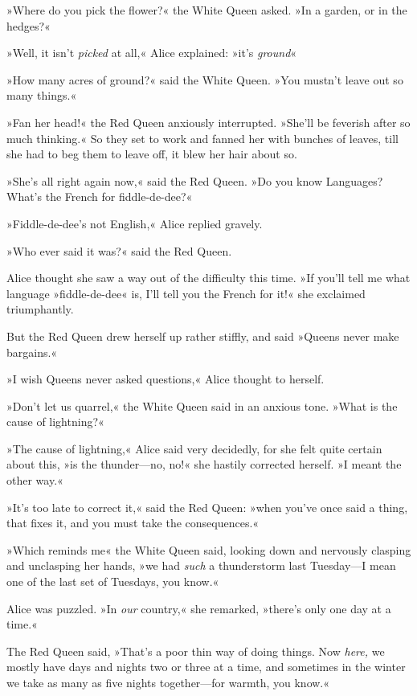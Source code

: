 »Where do you pick the flower?« the White Queen asked. »In a garden, or in the hedges?«

»Well, it isn't \textit{picked} at all,« Alice explained: »it's \textit{ground}\longdash«

»How many acres of ground?« said the White Queen. »You mustn't leave out so many things.«

»Fan her head!« the Red Queen anxiously interrupted. »She'll be feverish after so much thinking.« So they set to work and fanned her with bunches of leaves, till she had to beg them to leave off, it blew her hair about so.

»She's all right again now,« said the Red Queen. »Do you know Languages? What's the French for fiddle-de-dee?«

»Fiddle-de-dee's not English,« Alice replied gravely.

»Who ever said it was?« said the Red Queen.

Alice thought she saw a way out of the difficulty this time. »If you'll tell me what language »fiddle-de-dee« is, I'll tell you the French for it!« she exclaimed triumphantly.

But the Red Queen drew herself up rather stiffly, and said »Queens never make bargains.«

»I wish Queens never asked questions,« Alice thought to herself.

»Don't let us quarrel,« the White Queen said in an anxious tone. »What is the cause of lightning?«

»The cause of lightning,« Alice said very decidedly, for she felt quite certain about this, »is the thunder—no, no!« she hastily corrected herself. »I meant the other way.«

»It's too late to correct it,« said the Red Queen: »when you've once said a thing, that fixes it, and you must take the consequences.«

»Which reminds me\longdash« the White Queen said, looking down and nervously clasping and unclasping her hands, »we had \textit{such} a thunderstorm last Tuesday—I mean one of the last set of Tuesdays, you know.«

Alice was puzzled. »In \textit{our} country,« she remarked, »there's only one day at a time.«

The Red Queen said, »That's a poor thin way of doing things. Now \textit{here,} we mostly have days and nights two or three at a time, and sometimes in the winter we take as many as five nights together—for warmth, you know.«

